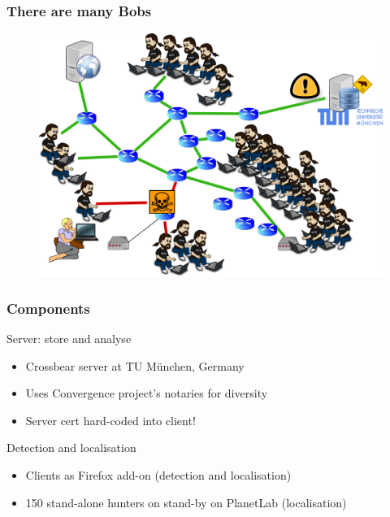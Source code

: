 \begin{frame}
\frametitle{There are many Bobs}
  \begin{block}{}
    \vskip -1.2cm
    \begin{figure}[t]
    \centering
     \includegraphics[scale=.36]{figures/hunting-4-manyreporting}
    \end{figure}
  \end{block}
\end{frame}

\begin{frame}
\frametitle{Components}
\begin{block}{Server: store and analyse}
 \begin{itemize}
   \item Crossbear server at TU M{\"u}nchen, Germany
   \item Uses Convergence project's notaries for diversity
   \item Server cert hard-coded into client!
 \end{itemize}
\end{block}
\begin{block}{Detection and localisation}
 \begin{itemize}
   \item Clients as Firefox add-on (detection and localisation)
   \item 150 stand-alone hunters on stand-by on PlanetLab (localisation)
 \end{itemize}
\end{block}
\end{frame}

